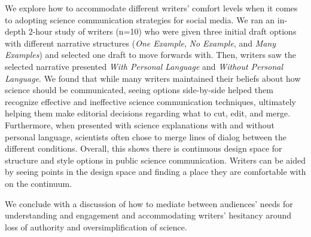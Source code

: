 We explore how to accommodate different writers' comfort levels when it comes to adopting science communication strategies for social media. We ran an in-depth 2-hour study of writers (n=10) who were given three initial draft options with different narrative structures (\textit{One Example}, \textit{No Example}, and \textit{Many Examples}) and selected one draft to move forwards with. Then, writers saw the selected narrative presented \textit{With Personal Language} and \textit{Without Personal Language}. We found that while many writers maintained their beliefs about how science should be communicated, seeing options side-by-side helped them recognize effective and ineffective science communication techniques, ultimately helping them make editorial decisions regarding what to cut, edit, and merge. Furthermore, when presented with science explanations with and without personal language, scientists often chose to merge lines of dialog between the different conditions. Overall, this shows there is continuous design space for structure and style options in public science communication. Writers can be aided by seeing points in the design space and finding a place they are comfortable with on the continuum. 

We conclude with a discussion of how to mediate between audiences' needs for understanding and engagement and accommodating writers' hesitancy around loss of authority and oversimplification of science.




